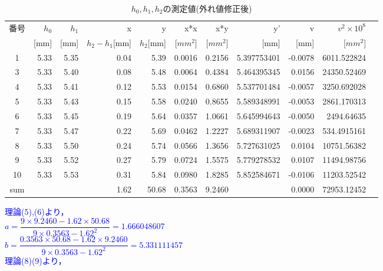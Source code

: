 \documentclass[a4paper,1pt]{jsarticle}
\newcommand{\blue}[1]{\textcolor{blue}{#1}}
\begin{document}
\begin{table}[H]
  \caption{$h_0,h_1,h_2$の測定値(外れ値修正後)}
  \label{table:SpeedOfLight}
  \centering
  \begin{tabular}{|c||r|r|r|r|r|r|r|r|r|r|}
    \hline
    番号 & $h_0$ & $h_1$ & x & y & x*x & x*y & y' & v & $v^2\times10^8$\\
    &[mm] & [mm] & $h_2-h_1$[mm] & $h_2$[mm] & [$mm^2$] & [$mm^2$] & [mm] & [mm] & [$mm^2$]\\
    \hline \hline
    1 & 5.33 & 5.35 & 0.04 & 5.39 & 0.0016 & 0.2156 & 5.397753401 & -0.0078 & 6011.522824 \\
    3 & 5.33 & 5.40 & 0.08 & 5.48 & 0.0064 & 0.4384 & 5.464395345 & 0.0156 & 24350.52469 \\
    4 & 5.33 & 5.41 & 0.12 & 5.53 & 0.0154 & 0.6860 & 5.537701484 & -0.0057 & 3250.692028 \\
    5 & 5.33 & 5.43 & 0.15 & 5.58 & 0.0240 & 0.8655 & 5.589348991 & -0.0053 & 2861.170313 \\
    6 & 5.33 & 5.45 & 0.19 & 5.64 & 0.0357 & 1.0661 & 5.645994643 & -0.0050 & 2494.64635 \\
    7 & 5.33 & 5.47 & 0.22 & 5.69 & 0.0462 & 1.2227 & 5.689311907 & -0.0023 & 534.4915161 \\
    8 & 5.33 & 5.50 & 0.24 & 5.74 & 0.0566 & 1.3656 & 5.727631025 & 0.0104 & 10751.56382 \\
    9 & 5.33 & 5.52 & 0.27 & 5.79 & 0.0724 & 1.5575 & 5.779278532 & 0.0107 & 11494.98756 \\
    10 & 5.33 & 5.53 & 0.31 & 5.84 & 0.0980 & 1.8285 & 5.852584671 & -0.0106 & 11203.52542 \\

   \hline
   sum &  &  & 1.62 & 50.68 & 0.3563 & 9.2460 &  & 0.0000 & 72953.12452 \\
    \hline
  \end{tabular}


\end{table}

\blue{理論(5),(6)より，}\\

\blue{$a=\dfrac{9\times9.2460-1.62\times50.68}{9\times0.3563-1.62^2}=1.666048607$}\\

\blue{$b=\dfrac{0.3563\times50.68-1.62\times9.2460}{9\times0.3563-1.62^2}=5.331111457$}\\

\blue{理論(8)(9)より，}\\
\end{document}
